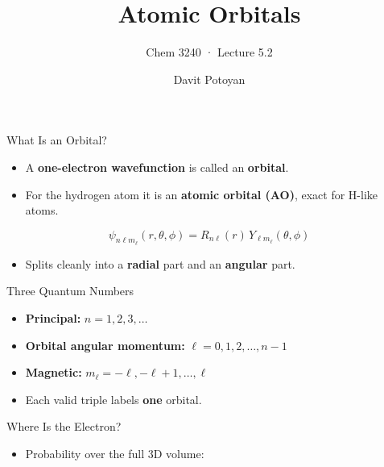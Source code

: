 \documentclass[
  ignorenonframetext,
  aspectratio=169,
  handout]{beamer}
\title{\texorpdfstring{Atomic Orbitals}{Atomic Orbitals}}
\subtitle{\texorpdfstring{Chem 3240 · Lecture
5.2}{Chem 3240 · Lecture 5.2}}
\author{Davit Potoyan}
\date{}
\providecommand{\tightlist}{%
  \setlength{\itemsep}{0pt}\setlength{\parskip}{0pt}}
\begin{document}
\frame{\titlepage}


\begin{frame}
\begin{block}{What Is an Orbital?}
\protect{}\label{what-is-an-orbital}
\begin{itemize}
\tightlist
\item
  A \textbf{one-electron wavefunction} is called an \textbf{orbital}.
\item
  For the hydrogen atom it is an \textbf{atomic orbital (AO)}, exact for
  H-like atoms.
\end{itemize}

\[\psi_{n\ell m_\ell}(r,\theta,\phi) = R_{n\ell}(r)\,Y_{\ell m_\ell}(\theta,\phi)\]

\begin{itemize}
\tightlist
\item
  Splits cleanly into a \textbf{radial} part and an \textbf{angular}
  part.
\end{itemize}
\end{block}

\begin{block}{Three Quantum Numbers}
\protect{}\label{three-quantum-numbers}
\begin{itemize}
\tightlist
\item
  \textbf{Principal:} \(n = 1, 2, 3, \ldots\)
\end{itemize}

\begin{itemize}
\tightlist
\item
  \textbf{Orbital angular momentum:} \(\ell = 0, 1, 2, \ldots, n-1\)
\end{itemize}

\begin{itemize}
\tightlist
\item
  \textbf{Magnetic:} \(m_\ell = -\ell, -\ell+1, \ldots, \ell\)
\end{itemize}

\begin{itemize}
\tightlist
\item
  Each valid triple labels \textbf{one} orbital.
\end{itemize}
\end{block}

\begin{block}{Where Is the Electron?}
\protect{}\label{where-is-the-electron}
\begin{itemize}
\tightlist
\item
  Probability over the full 3D volume:
\end{itemize}


\end{block}
\end{frame}
\end{document}
